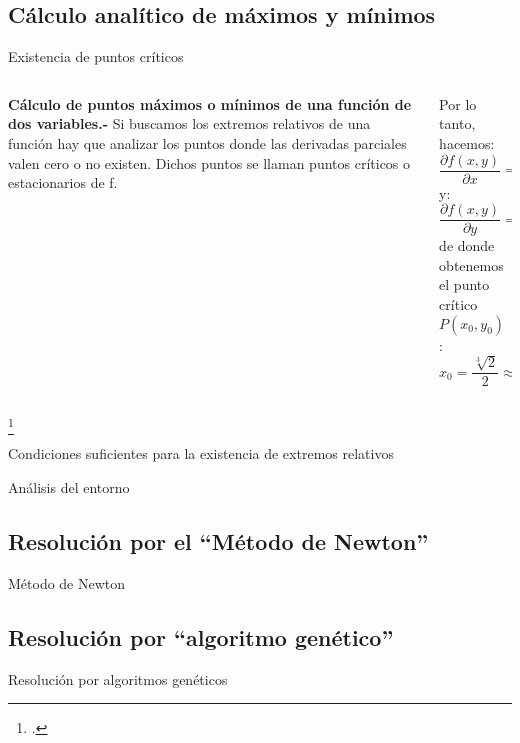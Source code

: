 \subsection{Cálculo analítico de máximos y mínimos}
    \begin{frame}{Existencia de puntos críticos}
        \begin{columns}
            \begin{column}{0.47\textwidth}
                \justify
                \textbf{Cálculo de puntos máximos o mínimos de una función de dos variables.-}  Si buscamos los extremos relativos de una función hay que analizar los puntos donde las derivadas parciales valen cero o no existen. Dichos puntos se llaman puntos críticos o estacionarios de f.\footnotemark
            \end{column}
            \begin{column}{0.47\textwidth}
                Por lo tanto, hacemos:
                \[\frac{\partial f(x,y)}{\partial x}=f_{x}(x,y)=4x^{3}-1=0\]
                y:
                \[\frac{\partial f(x,y)}{\partial y}=f_{y}(x,y)=4y^{3}=0\]
                de donde obtenemos el punto crítico  $P(x_{0},y_{0})$ :
                \[x_{0}=\frac{\sqrt[3]{2}}{2} \approx 0.62996; 
                y_{0}=0\]
            \end{column}
        \end{columns}
        \footcitetext{Upm17}
    \end{frame}
    \begin{frame}{Condiciones suficientes para la existencia de extremos relativos}
                
    \end{frame}
    \begin{frame}{Análisis del entorno}
        
    \end{frame}
\subsection{Resolución por el ``Método de Newton''}
\begin{frame}{Método de Newton}
    
\end{frame}
\subsection{Resolución por ``algoritmo genético''}
\begin{frame}{Resolución por algoritmos genéticos}
    
\end{frame}
